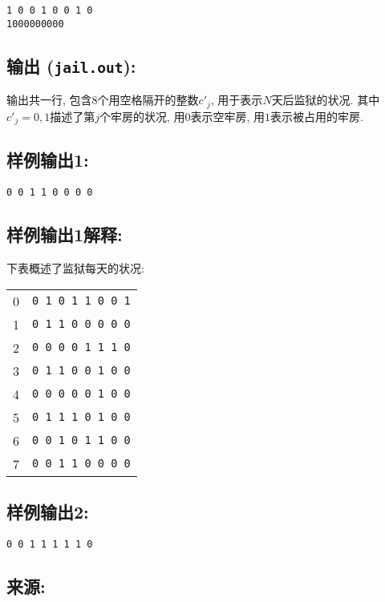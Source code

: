 \documentclass{article}
\begin{document}
\begin{verbatim}
1 0 0 1 0 0 1 0
1000000000
\end{verbatim}

\subsection*{输出 (\texttt{jail.out}):}

输出共一行, 包含8个用空格隔开的整数$c'_j$, 用于表示$N$天后监狱的状况.
其中$c'_j=0,1$描述了第$j$个牢房的状况, 用$0$表示空牢房, 用$1$表示被占用的牢房.

\subsection*{样例输出1:}

\begin{verbatim}
0 0 1 1 0 0 0 0
\end{verbatim}

\subsection*{样例输出1解释:}

下表概述了监狱每天的状况:
\begin{table}[h!]
\centering
\begin{tabular}{c|c}
0 & \texttt{0 1 0 1 1 0 0 1}\\
1 & \texttt{0 1 1 0 0 0 0 0}\\
2 & \texttt{0 0 0 0 1 1 1 0}\\
3 & \texttt{0 1 1 0 0 1 0 0}\\
4 & \texttt{0 0 0 0 0 1 0 0}\\
5 & \texttt{0 1 1 1 0 1 0 0}\\
6 & \texttt{0 0 1 0 1 1 0 0}\\
7 & \texttt{0 0 1 1 0 0 0 0}\\
\end{tabular}
\end{table}

\subsection*{样例输出2:}

\begin{verbatim}
0 0 1 1 1 1 1 0
\end{verbatim}

\subsection*{来源:}
\end{document}
